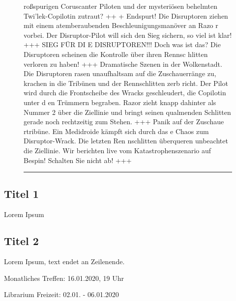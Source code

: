 \begin{figure}[!t]
\begin{minipage}[t][46em][t]{1.0\textwidth}
{{roßspurigen Coruscanter Piloten und der mysteriösen behelmten Twi’lek-Copilotin zutraut? ++\B%
+ Endspurt! Die Disruptoren ziehen mit einem atemberaubenden Beschleunigungsmanöver an Razo\B%
r vorbei. Der Disruptor-Pilot will sich den Sieg sichern, so viel ist klar! +++ SIEG FÜR DI\B%
E DISRUPTOREN!!! Doch was ist das? Die Disruptoren scheinen die Kontrolle über ihren Rennsc\B%
hlitten verloren zu haben! +++ Dramatische Szenen in der Wolkenstadt. Die Disruptoren rasen\Bs%
 unaufhaltsam auf die Zuschauerränge zu, krachen in die Tribünen und der Rennschlitten zerb\B%
richt. Der Pilot wird durch die Frontscheibe des Wracks geschleudert, die Copilotin unter d\B%
en Trümmern begraben. Razor zieht knapp dahinter als Nummer 2 über die Ziellinie und bringt\Bs%
 seinen qualmenden Schlitten gerade noch rechtzeitig zum Stehen. +++ Panik auf der Zuschaue\B%
rtribüne. Ein Medidroide kämpft sich durch das e Chaos zum Disruptor-Wrack. Die letzten Ren\B%
nschlitten überqueren unbeachtet die Ziellinie. Wir berichten live vom Katastrophenszenario\Bs%
 auf Bespin! Schalten Sie nicht ab! +++%
}}
\vspace{.42em}
\hrule
\end{minipage}
\vspace{-1em}
\end{figure}

\subsection{Titel 1}
Lorem Ipsum

\subsection{Titel 2}
Lorem Ipsum, text endet an Zeilenende.


\begin{termine}
  \item Monatliches Treffen: 16.01.2020, 19 Uhr
  \item Librarium Freizeit: 02.01. - 06.01.2020
\end{termine}


